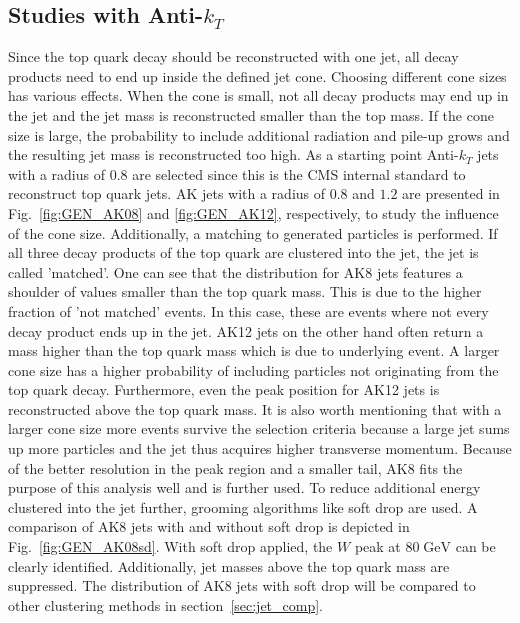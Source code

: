 \FloatBarrier %
\subsection{Studies with Anti-$k_T$}
\label{sec:AK}	
	Since the top quark decay should be reconstructed with one jet, all decay products need to end up inside the defined jet cone. Choosing different cone sizes has various effects. When the cone is small, not all decay products may end up in the jet and the jet mass is reconstructed smaller than the top mass. If the cone size is large, the probability to include additional radiation and pile-up grows and the resulting jet mass is reconstructed too high.	As a starting point Anti-$k_T$ jets with a radius of $0.8$ are selected since this is the CMS internal standard to reconstruct top quark jets. AK jets with a radius of $0.8$ and $1.2$ are presented in Fig.~\ref{fig:GEN_AK08} and \ref{fig:GEN_AK12}, respectively, to study the influence of the cone size. Additionally, a matching to generated particles is performed. If all three decay products of the top quark are clustered into the jet, the jet is called 'matched'. One can see that the distribution for AK8 jets features a shoulder of values smaller than the top quark mass. This is due to the higher fraction of 'not matched' events. In this case, these are events where not every decay product ends up in the jet. AK12 jets on the other hand often return a mass higher than the top quark mass which is due to underlying event. A larger cone size has a higher probability of including particles not originating from the top quark decay. Furthermore, even the peak position for AK12 jets is reconstructed above the top quark mass. It is also worth mentioning that with a larger cone size more events survive the selection criteria because a large jet sums up more particles and the jet thus acquires higher transverse momentum. Because of the better resolution in the peak region and a smaller tail, AK8 fits the purpose of this analysis well and is further used. To reduce additional energy clustered into the jet further, grooming algorithms like soft drop are used. A comparison of AK8 jets with and without soft drop is depicted in Fig.~\ref{fig:GEN_AK08sd}. With soft drop applied, the $W$ peak at $80\;\text{GeV}$ can be clearly identified. Additionally, jet masses above the top quark mass are suppressed. The distribution of AK8 jets with soft drop will be compared to other clustering methods in section~\ref{sec:jet_comp}.

